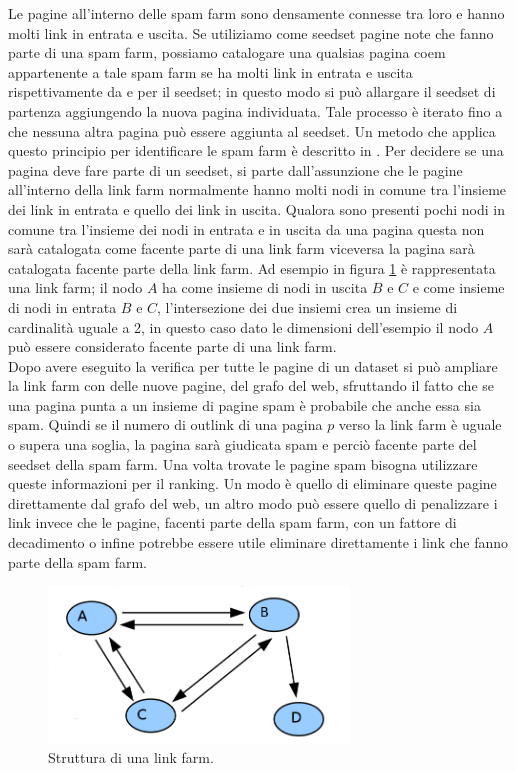 Le pagine all'interno delle spam farm sono densamente connesse tra loro e hanno molti link in entrata e uscita. Se utiliziamo come seedset pagine note che fanno parte di una spam farm, possiamo catalogare una qualsias pagina coem appartenente a tale spam farm se ha molti link in entrata e uscita rispettivamente da e per il seedset; in questo modo si può allargare il seedset di partenza aggiungendo la nuova pagina individuata. Tale processo è iterato fino a che nessuna altra pagina può essere aggiunta al seedset. Un metodo che applica questo principio per identificare le spam farm è descritto  in \cite{Wu05identifyinglink}. Per decidere se una pagina deve fare parte di un seedset, si parte dall'assunzione che le pagine all'interno della link farm normalmente hanno molti nodi in comune tra l'insieme dei link in entrata e quello dei link in uscita. Qualora  sono presenti pochi nodi in comune tra l'insieme dei nodi in entrata e in uscita da una pagina questa non sarà catalogata come facente parte di una link farm viceversa la pagina sarà catalogata facente parte della link farm. Ad esempio in figura \ref{fig:linkfarm} è rappresentata una link farm; il nodo \(A\) ha come insieme di nodi in uscita \(B\) e \(C\)  e come insieme di nodi in entrata \(B\) e \(C\), l'intersezione dei due insiemi crea un insieme di cardinalità uguale a 2, in questo caso dato le dimensioni dell'esempio il nodo \(A\) può essere considerato facente parte di una link farm.\\
Dopo avere eseguito la verifica per tutte le pagine di un dataset si può ampliare la link farm con delle nuove pagine, del grafo del web, sfruttando il fatto che se una pagina punta a un insieme di pagine spam è probabile che anche essa sia spam. Quindi se il numero di outlink di una pagina \(p\) verso la link farm è uguale o supera una soglia, la pagina sarà giudicata spam e perciò facente parte del seedset della spam farm. Una volta trovate le pagine spam bisogna utilizzare queste informazioni per il ranking. Un modo è quello di eliminare queste pagine direttamente dal grafo del web, un altro modo può essere quello di penalizzare i link invece che le pagine, facenti parte della spam farm, con un fattore di decadimento o infine potrebbe essere utile eliminare direttamente i link che fanno parte della spam farm.
\begin{figure}
\centering
\includegraphics[width=8cm]{immagini/linkfarm/linkfarm}
\caption{Struttura di una link farm.}
\label{fig:linkfarm}
\end{figure}

